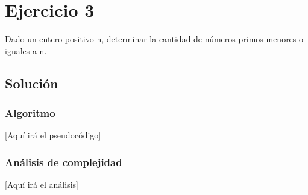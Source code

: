 \section{Ejercicio 3}
Dado un entero positivo n, determinar la cantidad de números primos menores o iguales a n.

\subsection*{Solución}
\subsubsection*{Algoritmo}
[Aquí irá el pseudocódigo]

\subsubsection*{Análisis de complejidad}
[Aquí irá el análisis] 